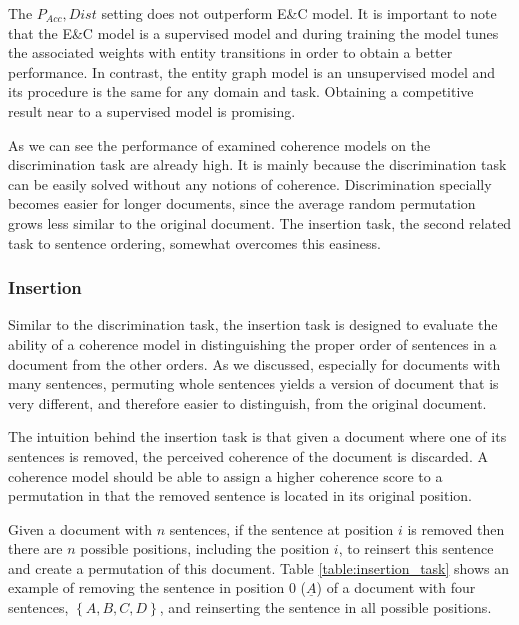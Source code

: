 The $P_{Acc}, Dist$ setting does not outperform E\&C model. 
It is important to note that the E\&C model is a supervised model and during training the model tunes the associated weights with entity transitions in order to obtain a better performance. 
In contrast, the entity graph model is an unsupervised model and its procedure is the same for any domain and task. 
Obtaining a competitive result near to a supervised model is promising.  


As we can see the performance of examined coherence models on the discrimination task are already high. 
It is mainly because the discrimination task can be easily solved without any notions of coherence. 
Discrimination specially becomes easier for longer documents, since the average random permutation grows less similar to the original document. 
The insertion task, the second related task to sentence ordering, somewhat overcomes this easiness. 


\subsubsection{Insertion}
%
Similar to the discrimination task, the insertion task \cite{chenerdong07} is designed to evaluate the ability of a coherence model in distinguishing the proper order of sentences in a document from the other orders. 
As we discussed, especially for documents with many sentences, permuting whole sentences yields a version of document that is very different, and therefore easier to distinguish, from the original document. 

The intuition behind the insertion task is that given a document where one of its sentences is removed, the perceived coherence 
of the document is discarded. 
A coherence model should be able to assign a higher coherence score to a permutation in that the removed sentence is located in its original position. 

Given a document with $n$ sentences, if the sentence at position $i$ is removed then there are $n$ possible positions, including the position $i$, to reinsert this sentence and create a permutation of this document. 
Table \ref{table:insertion_task} shows an example of removing the sentence in position $0$ ($\underline{A}$) of a document with four sentences, $\left \{ A, B, C, D \right \}$, and reinserting the sentence in all possible positions. 
 

